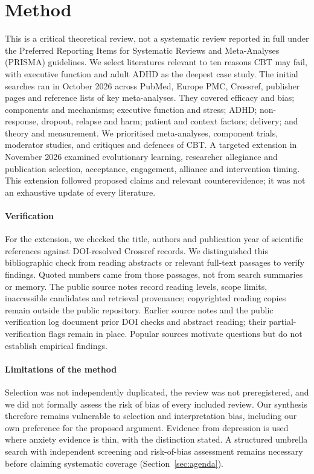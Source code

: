 \section{Method}\label{sec:method}
This is a critical theoretical review, not a systematic review reported in full under the Preferred Reporting Items for Systematic Reviews and Meta-Analyses (PRISMA) guidelines.
We select literatures relevant to ten reasons CBT may fail, with executive function and adult ADHD as the deepest case study.
The initial searches ran in October 2026 across PubMed, Europe PMC, Crossref, publisher pages and reference lists of key meta-analyses.
They covered efficacy and bias; components and mechanisms; executive function and stress; ADHD; non-response, dropout, relapse and harm; patient and context factors; delivery; and theory and measurement.
We prioritised meta-analyses, component trials, moderator studies, and critiques and defences of CBT.
A targeted extension in November 2026 examined evolutionary learning, researcher allegiance and publication selection, acceptance, engagement, alliance and intervention timing.
This extension followed proposed claims and relevant counterevidence; it was not an exhaustive update of every literature.

\paragraph{Verification}
For the extension, we checked the title, authors and publication year of scientific references against DOI-resolved Crossref records.
We distinguished this bibliographic check from reading abstracts or relevant full-text passages to verify findings.
Quoted numbers came from those passages, not from search summaries or memory.
The public source notes record reading levels, scope limits, inaccessible candidates and retrieval provenance; copyrighted reading copies remain outside the public repository.
Earlier source notes and the public verification log document prior DOI checks and abstract reading; their partial-verification flags remain in place.
Popular sources motivate questions but do not establish empirical findings.

\paragraph{Limitations of the method}
Selection was not independently duplicated, the review was not preregistered, and we did not formally assess the risk of bias of every included review.
Our synthesis therefore remains vulnerable to selection and interpretation bias, including our own preference for the proposed argument.
Evidence from depression is used where anxiety evidence is thin, with the distinction stated.
A structured umbrella search with independent screening and risk-of-bias assessment remains necessary before claiming systematic coverage (Section~\ref{sec:agenda}).
